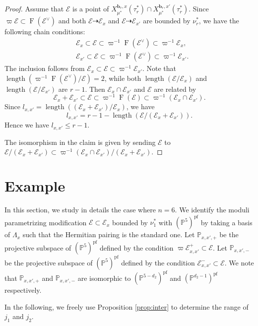 \documentclass[12pt,a4paper]{article}
\DeclareMathOperator{\length}{length}
\DeclareMathOperator{\oF}{F}
\newcommand{\bP}{\mathbb{P}}
\newcommand{\bfb}{\mathbf{b}}
\newcommand{\cE}{\mathcal{E}}
\begin{document}
\begin{proof}

Assume that $\cE$ is a point of $X_{\mu^*}^{\bfb_r,x}(\tau_r^*) \cap X_{\mu^*}^{\bfb_r,x'}(\tau_r^*)$. Since $\varpi \cE \subset \oF (\cE^{\vee})$ and both $\cE \dashrightarrow \cE_x$ and $\cE \dashrightarrow \cE_{x'}$ are bounded by $\nu_r^*$, we have the following chain conditions:
\begin{align*}
 &\cE_x \subset \cE \subset  \varpi^{-1} \oF (\cE^{\vee}) \subset \varpi^{-1} \cE_x , \\ 
  & \cE_{x'} \subset \cE \subset  \varpi^{-1} \oF (\cE^{\vee}) \subset \varpi^{-1} \cE_{x'}.   
\end{align*}
The inclusion follows from 
$\cE_x \subset \cE \subset \varpi^{-1} \cE_{x'}$. 
Note that $\length ( \varpi^{-1} \oF (\cE^{\vee})  / \cE  )=2$, while both $\length (\cE  / \cE_x )$ and $\length ( \cE  / \cE_{x'} )$ are $r-1$.
Then $\cE_x \cap \cE_{x'}$ and $\cE$ are related by
\[ 
 \cE_x + \cE_{x'} \subset \cE \subset  \varpi^{-1} \oF (\cE)  \subset \varpi^{-1} (\cE_x \cap \cE_{x'}) . 
\]
Since $l_{x,x'} = \length ( (\cE_x + \cE_{x'})/ \cE_x )$, 
we have
$$l_{x,x'} = r -1 - \length(\cE/(\cE_x + \cE_{x'} )).$$
Hence we have $l_{x,x'} \leq r-1$. 

The isomorphism in the claim is given by sending $\cE$ to $\cE/ (\cE_x + \cE_{x'}) \subset  \varpi^{-1} (\cE_x \cap \cE_{x'}) /  (\cE_x + \cE_{x'})$. 
\end{proof}



\section{Example}\label{sec:Exa}
In this section, we study in details the case where $n=6$. 
We identify the moduli parametrizing 
modification $\cE \subset \cE_x$ bounded by $\nu_1^*$ 
with $(\bP^5)^{\mathrm{pf}}$ 
by taking a basis of $\Lambda_x$ such that 
the Hermitian pairing is the standard one. 
Let $\bP_{x,x',+}$ be the projective subspace of 
$(\bP^5)^{\mathrm{pf}}$ defined by the condition 
$\varpi \cE_{x,x'}^+ \subset \cE$. 
Let $\bP_{x,x',-}$ be the projective subspace of 
$(\bP^5)^{\mathrm{pf}}$ defined by the condition 
$\cE_{x,x'}^- \subset \cE$. 
We note that 
$\bP_{x,x',+}$ and $\bP_{x,x',-}$ are 
isomorphic to 
$(\bP^{5-d_2})^{\mathrm{pf}}$ 
and 
$(\bP^{d_2 -1})^{\mathrm{pf}}$ respectively. 

In the following, we freely use Proposition \ref{prop:inter} to determine the range of $j_1$ and $j_2$. 
\end{document}
